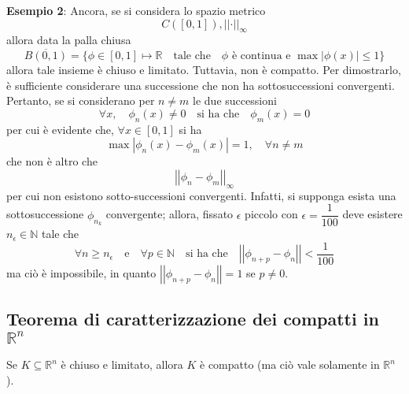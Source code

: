 \documentclass[a4paper]{extarticle}
\begin{document}
\vspace{1em}
\noindent
\textbf{Esempio 2}: Ancora, se si considera lo spazio metrico
\[C([0,1]), \vert \vert \cdot \vert \vert_{\infty}\]
allora data la palla chiusa
\[\overline{B(0,1)} = \{\phi \in [0,1] \longmapsto \mathbb{R} \hspace{1em} \text{tale che} \hspace{1em} \phi \text{ è continua e } \max \left \vert \phi(x) \right \vert \leq 1\}\]
allora tale insieme è chiuso e limitato. Tuttavia, non è compatto. Per dimostrarlo, è sufficiente considerare una successione che non ha sottosuccessioni convergenti.\\
Pertanto, se si considerano per $n \neq m$ le due successioni
\[\forall x, \hspace{1em} \phi_n(x) \neq 0 \hspace{1em} \text{si ha che} \hspace{1em} \phi_m(x) = 0\]
per cui è evidente che, $\forall x \in [0,1]$ si ha
\[\max \left \vert \phi_n(x) - \phi_m(x)\right \vert = 1, \hspace{1em} \forall n \neq m\]
che non è altro che
\[\left \vert \left \vert \phi_n - \phi_m \right \vert \right \vert_\infty\]
per cui non esistono sotto-successioni convergenti. Infatti, si supponga esista una sottosuccessione $\phi_{n_k}$ convergente; allora, fissato $\epsilon$ piccolo con $\epsilon=\dfrac{1}{100}$ deve esistere $n_\epsilon \in \mathbb{N}$ tale che
\[\forall n \geq n_\epsilon \hspace{1em} \text{e} \hspace{1em} \forall p \in \mathbb{N} \hspace{1em} \text{si ha che} \hspace{1em} \left \vert \left \vert \phi_{n+p} - \phi_n \right \vert \right \vert < \frac{1}{100}\]
ma ciò è impossibile, in quanto $\left \vert \left \vert \phi_{n+p} - \phi_n \right \vert \right \vert=1$ se $p \neq 0$.

\vspace{1em}
\noindent
\subsection{Teorema di caratterizzazione dei compatti in $\mathbb{R}^n$}
Se $K \subseteq \mathbb{R}^n$ è chiuso e limitato, allora $K$ è compatto (ma ciò vale solamente in $\mathbb{R}^n$).
\end{document}
